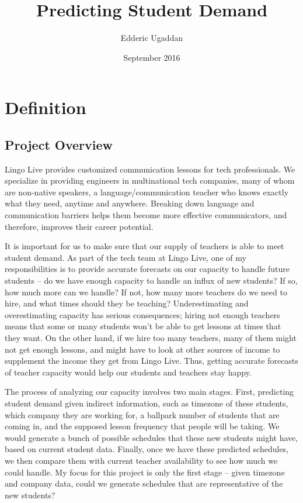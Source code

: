 \documentclass{article}
\title{Predicting Student Demand}
\author{Edderic Ugaddan}
\date{September 2016}
\begin{document}
\maketitle


\section{Definition}

\subsection{Project Overview}
Lingo Live provides customized communication lessons for tech professionals.
We specialize in providing engineers in multinational tech companies, many of
whom are non-native speakers, a language/communication teacher who knows
exactly what they need, anytime and anywhere. Breaking down language and
communication barriers helps them become more effective communicators, and
therefore, improves their career potential.

It is important for us to make sure that our supply of teachers is able to meet
student demand. As part of the tech team at Lingo Live, one of my
responsibilities is to provide accurate forecasts on our capacity to handle
future students -- do we have enough capacity to handle an influx of new
students? If so, how much more can we handle? If not, how many more teachers do
we need to hire, and what times should they be teaching? Underestimating and
overestimating capacity has serious consequences; hiring not enough teachers
means that some or many students won't be able to get lessons at times that
they want. On the other hand, if we hire too many teachers, many of them might
not get enough lessons, and might have to look at other sources of income to
supplement the income they get from Lingo Live. Thus, getting accurate
forecasts of teacher capacity would help our students and teachers stay happy.

The process of analyzing our capacity involves two main stages. First,
predicting student demand given indirect information, such as timezone of these
students, which company they are working for, a ballpark number of students
that are coming in, and the supposed lesson frequency that people will be
taking.  We would generate a bunch of possible schedules that these new
students might have, based on current student data. Finally, once we have these
predicted schedules, we then compare them with current teacher availability to
see how much we could handle. My focus for this project is only the first stage
-- given timezone and company data, could we generate schedules that are
representative of the new students?
\end{document}
